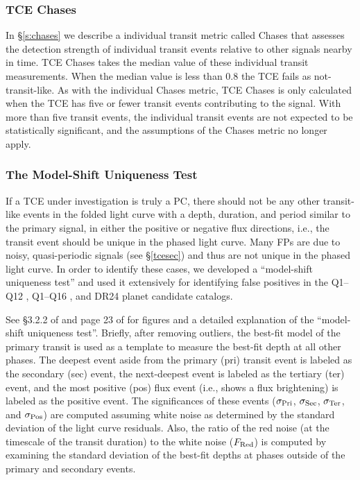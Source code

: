 


\subsubsection{TCE Chases}
\label{s:tcechases}

In \S\ref{s:chases} we describe a individual transit metric called Chases that assesses the detection strength of individual transit events relative to other signals nearby in time. TCE Chases takes the median value of these individual transit measurements.  When the median value is less than 0.8 the TCE fails as not-transit-like.  As with the individual Chases metric, TCE Chases is only calculated when the TCE has five or fewer transit events contributing to the signal.  With more than five transit events, the individual transit events are not expected to be statistically significant, and the assumptions of the Chases metric no longer apply.


\subsubsection{The Model-Shift Uniqueness Test}
\label{s:ms}

If a TCE under investigation is truly a PC, there should not be any other transit-like events in the folded light curve with a depth, duration, and period similar to the primary signal, in either the positive or negative flux directions, i.e., the transit event should be unique in the phased light curve. Many FPs are due to noisy, quasi-periodic signals (see \S\ref{tcesec}) and thus are not unique in the phased light curve. In order to identify these cases, we developed a ``model-shift uniqueness test'' and used it extensively for identifying false positives in the Q1--Q12 \citep{Rowe2015a}, Q1--Q16 \citep{Mullally2015cat}, and DR24 \citep{Coughlin2016} planet candidate catalogs.

See \S3.2.2 of \citet{Rowe2015a} and page 23 of \citet{Coughlin2017b} for figures and a detailed explanation of the ``model-shift uniqueness test''. Briefly, after removing outliers, the best-fit model of the primary transit is used as a template to measure the best-fit depth at all other phases. The deepest event aside from the primary (pri) transit event is labeled as the secondary (sec) event, the next-deepest event is labeled as the tertiary (ter) event, and the most positive (pos) flux event (i.e., shows a flux brightening) is labeled as the positive event. The significances of these events ($\sigma_{\rm Pri}$, $\sigma_{\rm Sec}$, $\sigma_{\rm Ter}$, and $\sigma_{\rm Pos}$) are computed assuming white noise as determined by the standard deviation of the light curve residuals. Also, the ratio of the red noise (at the timescale of the transit duration) to the white noise ($F_{\rm Red}$) is computed by examining the standard deviation of the best-fit depths at phases outside of the primary and secondary events.  

